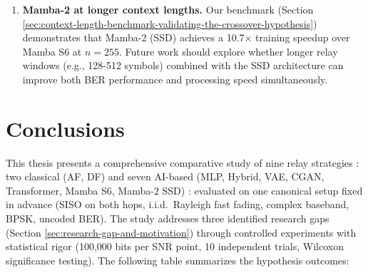 \begin{enumerate}
\item
  \textbf{Mamba-2 at longer context lengths.} Our benchmark (Section \ref{sec:context-length-benchmark-validating-the-crossover-hypothesis}) demonstrates that Mamba-2 (SSD) achieves a 10.7× training speedup over Mamba S6 at \(n = 255\). Future work should explore whether longer relay windows (e.g., 128-512 symbols) combined with the SSD architecture can improve both BER performance and processing speed simultaneously.
\end{enumerate}

\section{Conclusions}\label{sec:conclusions}

This thesis presents a comprehensive comparative study of nine relay strategies : two classical (AF, DF) and seven AI-based (MLP, Hybrid, VAE, CGAN, Transformer, Mamba S6, Mamba-2 SSD) : evaluated on one canonical setup fixed in advance (SISO on both hops, i.i.d.\ Rayleigh fast fading, complex baseband, BPSK, uncoded BER). The study addresses three identified research gaps (Section \ref{sec:research-gap-and-motivation}) through controlled experiments with statistical rigor (100,000 bits per SNR point, 10 independent trials, Wilcoxon significance testing). The following table summarizes the hypothesis outcomes:

